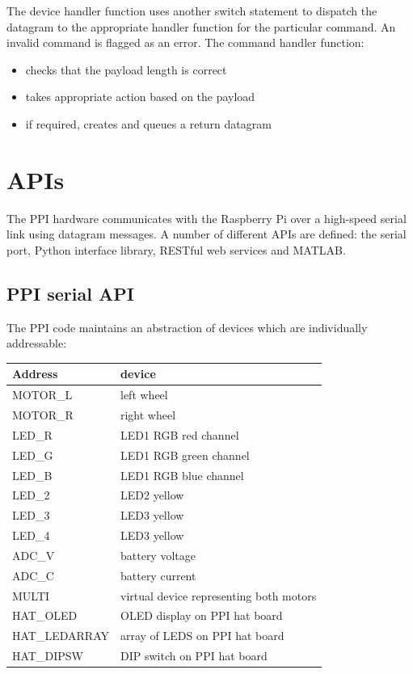 \documentclass[11pt,fleqn]{article}
\begin{document}
The device handler function uses another switch statement to dispatch the datagram to the appropriate handler function for the particular command.
 An invalid command is flagged as an error.
 The command handler function:
 \begin{itemize}
 \item checks that the payload length is correct
 \item takes appropriate action based on the payload
 \item if required, creates and queues a return datagram
 \end{itemize}

\section{APIs}
The PPI hardware communicates with the Raspberry Pi over a high-speed serial link using datagram messages.  A number of different
APIs are defined: the serial port, Python interface library, RESTful web services and MATLAB.

\subsection{PPI serial API}

The PPI code maintains an abstraction of devices which are individually addressable:

\begin{centering}
\begin{tabular}{|l|l|}\hline
Address & device \\ \hline\hline
MOTOR\_L & left wheel \\
MOTOR\_R &right wheel \\
LED\_R &  LED1 RGB red channel \\
LED\_G&  LED1 RGB green channel \\
LED\_B&  LED1 RGB blue channel \\
LED\_2 & LED2 yellow \\
LED\_3& LED3 yellow \\
LED\_4& LED3 yellow \\
ADC\_V & battery voltage \\
ADC\_C & battery current \\ 
MULTI & virtual device representing both motors \\ \hline
HAT\_OLED & OLED display on PPI hat board\\
HAT\_LEDARRAY & array of LEDS on PPI hat board \\
HAT\_DIPSW & DIP switch on PPI hat board \\ \hline
\end{tabular}
\end{centering}
\end{document}
